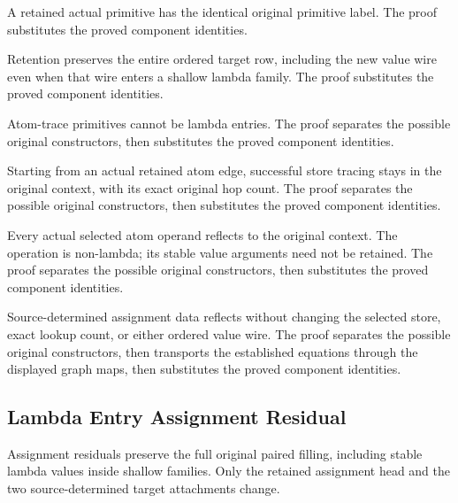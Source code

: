 A retained actual primitive has the identical original primitive label.
The proof substitutes the proved component identities.
\par{}

Retention preserves the entire ordered target row, including the new
value wire even when that wire enters a shallow lambda family.
The proof substitutes the proved component identities.
\par{}

Atom-trace primitives cannot be lambda entries.
The proof separates the possible original constructors, then substitutes the proved component identities.
\par{}

Starting from an actual retained atom edge, successful store tracing
stays in the original context, with its exact original hop count.
The proof separates the possible original constructors, then substitutes the proved component identities.
\par{}

Every actual selected atom operand reflects to the original context.
The operation is non-lambda; its stable value arguments need not be retained.
The proof separates the possible original constructors, then substitutes the proved component identities.
\par{}

Source-determined assignment data reflects without changing the selected
store, exact lookup count, or either ordered value wire.
The proof separates the possible original constructors, then transports the established equations through the displayed graph maps, then substitutes the proved component identities.
\par{}

\subsection{Lambda Entry Assignment Residual}
Assignment residuals preserve the full original paired filling, including
stable lambda values inside shallow families. Only the retained assignment
head and the two source-determined target attachments change.

